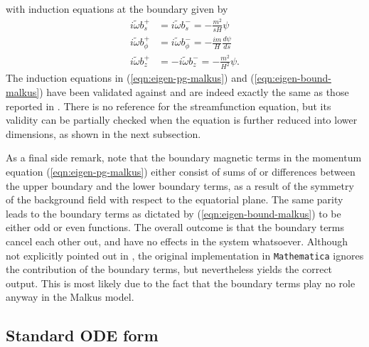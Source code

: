 with induction equations at the boundary given by
\begin{equation}\label{eqn:eigen-bound-malkus}
    \begin{aligned}
        i \widetilde{\omega} b^{+}_{s} &= i \widetilde{\omega} b^{-}_{s} = - \frac{m^{2}}{s H} \psi\\
        i \widetilde{\omega} b^{+}_{\phi} &= i \widetilde{\omega} b^{-}_{\phi} = - \frac{i m}{H} \frac{d \psi}{d s}\\
        i \widetilde{\omega} b^{+}_{z} &= -i \widetilde{\omega} b^{-}_{z} = - \frac{m^{2}}{H^{2}} \psi.
    \end{aligned}
\end{equation}
The induction equations in (\ref{eqn:eigen-pg-malkus}) and (\ref{eqn:eigen-bound-malkus}) have been validated against and are indeed exactly the same as those reported in \textcite{holdenried-chernoff_long_2021}.
There is no reference for the streamfunction equation, but its validity can be partially checked when the equation is further reduced into lower dimensions, as shown in the next subsection.

As a final side remark, note that the boundary magnetic terms in the momentum equation (\ref{eqn:eigen-pg-malkus}) either consist of sums of or differences between the upper boundary and the lower boundary terms, as a result of the symmetry of the background field with respect to the equatorial plane.
The same parity leads to the boundary terms as dictated by (\ref{eqn:eigen-bound-malkus}) to be either odd or even functions.
The overall outcome is that the boundary terms cancel each other out, and have no effects in the system whatsoever.
Although not explicitly pointed out in \textcite{holdenried-chernoff_long_2021}, the original implementation in \texttt{Mathematica} ignores the contribution of the boundary terms, but nevertheless yields the correct output. This is most likely due to the fact that the boundary terms play no role anyway in the Malkus model.

\subsection{Standard ODE form}

